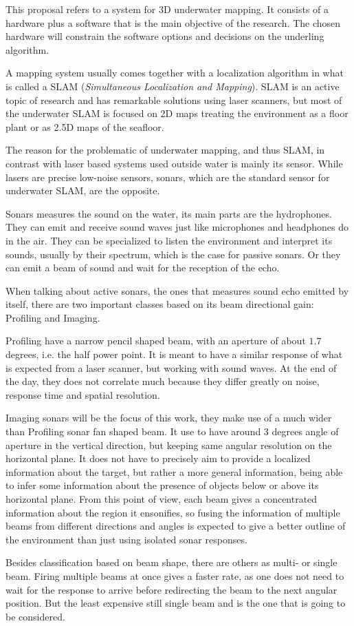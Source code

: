 This proposal refers to a system for 3D underwater mapping. It consists of a
hardware plus a software that is the main objective of the research. The
chosen hardware will constrain the software options and decisions on the
underling algorithm.

A mapping system usually comes together with a localization algorithm in what is
called a SLAM (\textit{Simultaneous Localization and Mapping}). SLAM is an
active topic of research and has remarkable solutions using laser scanners,
but most of the underwater SLAM is focused on 2D maps treating the environment
as a floor plant or as 2.5D maps of the seafloor.

The reason for the problematic of underwater mapping, and thus SLAM, in contrast
with laser based systems used outside water is mainly its sensor. While lasers
are precise low-noise sensors, sonars, which are the standard sensor for
underwater SLAM, are the opposite.

Sonars measures the sound on the water, its main parts are the hydrophones. They
can emit and receive sound waves just like microphones and headphones do in the
air. They can be specialized to listen the environment and interpret its sounds,
usually by their spectrum, which is the case for passive sonars. Or they can
emit a beam of sound and wait for the reception of the echo.

 When talking about active sonars, the ones that measures sound echo emitted
by itself, there are two important classes based on its beam directional gain:
Profiling and Imaging.

Profiling have a narrow pencil shaped beam, with an aperture of about $1.7$
degrees, i.e. the half power point. It is meant to have a similar response of
what is expected from a laser scanner, but working with sound waves. At the end
of the day, they does not correlate much because they differ greatly on noise,
response time and spatial resolution.

Imaging sonars will be the focus of this work, they make use of a much wider
than Profiling sonar fan shaped beam. It use to have around $3$ degrees angle of
aperture in the vertical direction, but keeping same angular resolution on the
horizontal plane.
It does not have to precisely aim to provide a localized information about the
target, but rather a more general information, being able to infer some information
about the presence of objects below or above its horizontal plane. From this
point of view, each beam gives a concentrated information about the region it
ensonifies, so fusing the information of multiple beams from different
directions and angles is expected to give a better outline of the environment
than just using isolated sonar responses.

Besides classification based on beam shape, there are others as multi- or single
beam. Firing multiple beams at once gives a faster rate, as one does not need to
wait for the response to arrive before redirecting the beam to the next angular
position. But the least expensive still single beam and is the one that is going
to be considered.